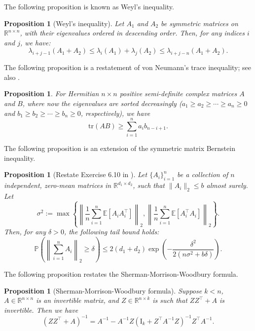 \documentclass{article}
\theoremstyle{plain}
\newtheorem{proposition}[theorem]{Proposition}
\theoremstyle{definition}
\theoremstyle{remark}
\begin{document}
\begin{appendix}
The following proposition is known as Weyl's inequality.

\begin{proposition}[Weyl's inequality]\label{prop_weyl_ine}
Let $A_1$ and $A_2$ be symmetric matrices on $\mathbb{R}^{n \times n}$, with their eigenvalues ordered in descending order. Then, for any indices $i$ and $j$, we have:
\[
\lambda_{i+j-1}(A_1 + A_2) \leq \lambda_i(A_1) + \lambda_j(A_2) \leq \lambda_{i+j-n}(A_1 + A_2).
\]
\end{proposition}






The following proposition is a restatement of von Neumann's trace inequality; see also \cite{marshall1979inequalities}.




\begin{proposition}\label{prop_ri}
    For Hermitian $n \times n$ positive semi-definite complex matrices $A$ and $B$, where now the eigenvalues are sorted decreasingly ($a_1 \geq a_2 \geq \cdots \geq a_n \geq 0$ and $b_1 \geq b_2 \geq \cdots \geq b_n \geq 0$, respectively), we have
$$
\mathrm{tr}\left( AB \right) \geq \sum_{i=1}^{n} a_i b_{n-i+1}.
$$
\end{proposition}






The following proposition is an extension of the symmetric matrix Bernstein inequality.

\begin{proposition}[Restate Exercise 6.10 in \cite{wainwright2019high}]\label{prop_non_sym_matrix_bernstein}
Let $\{A_i\}_{i=1}^n$ be a collection of $n$ independent, zero-mean matrices in $\mathbb{R}^{d_1 \times d_2}$, such that $\|A_i\|_2 \leq b$ almost surely. 
Let 
\[
\sigma^2 := \max\left\{
\left\|\frac{1}{n}\sum_{i=1}^n \mathbb{E}[A_i A_i^\top]\right\|_2,
\left\|\frac{1}{n}\sum_{i=1}^n \mathbb{E}[A_i^\top A_i]\right\|_2
\right\}.
\]
Then, for any $\delta > 0$, the following tail bound holds:
\[
\mathbb{P}\left(\left\|\sum_{i=1}^n A_i\right\|_2 \geq \delta\right) \leq 2(d_1 + d_2) \exp\left(-\frac{\delta^2}{2(n\sigma^2 + b\delta)}\right).
\]
\end{proposition}


The following proposition restates the Sherman-Morrison-Woodbury formula.


\begin{proposition}[Sherman-Morrison-Woodbury formula]\label{prop_smw_formula}
    Suppose $k < n$, $A \in \mathbb{R}^{n \times n}$ is an invertible matrix, and $Z \in \mathbb{R}^{n \times k}$ is such that $ZZ^{\top} + A$ is invertible. Then we have
    \[
(ZZ^{\top} + A)^{-1} = A^{-1} - A^{-1} Z(\mathrm{I}_{k} + Z^{\top} A^{-1} Z)^{-1} Z^{\top} A^{-1}.
\]
\end{proposition}


















\end{appendix}
\end{document}
